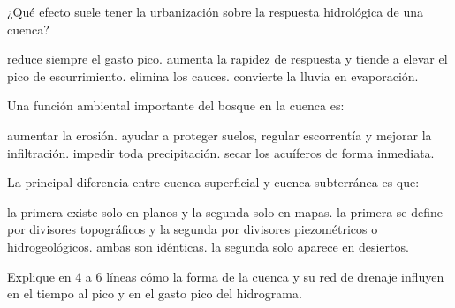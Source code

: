 \question [3] ¿Qué efecto suele tener la urbanización sobre la respuesta hidrológica de una cuenca?
\begin{choices}
\choice reduce siempre el gasto pico.
\CorrectChoice aumenta la rapidez de respuesta y tiende a elevar el pico de escurrimiento.
\choice elimina los cauces.
\choice convierte la lluvia en evaporación.
\end{choices}

\question [3] Una función ambiental importante del bosque en la cuenca es:
\begin{choices}
\choice aumentar la erosión.
\CorrectChoice ayudar a proteger suelos, regular escorrentía y mejorar la infiltración.
\choice impedir toda precipitación.
\choice secar los acuíferos de forma inmediata.
\end{choices}

\question [3] La principal diferencia entre cuenca superficial y cuenca subterránea es que:
\begin{choices}
\choice la primera existe solo en planos y la segunda solo en mapas.
\CorrectChoice la primera se define por divisores topográficos y la segunda por divisores piezométricos o hidrogeológicos.
\choice ambas son idénticas.
\choice la segunda solo aparece en desiertos.
\end{choices}

\question [8] Explique en 4 a 6 líneas cómo la forma de la cuenca y su red de drenaje influyen en el tiempo al pico y en el gasto pico del hidrograma.


